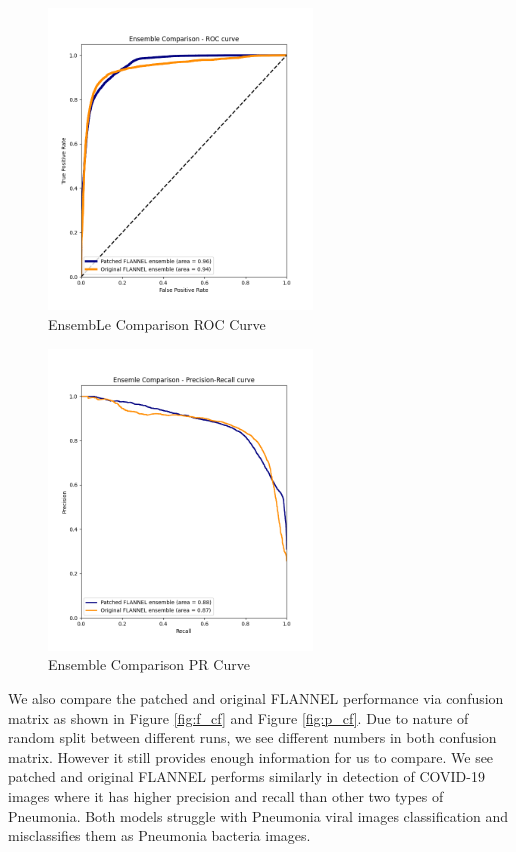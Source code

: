 \documentclass{sigkddExp}
\begin{document}
\begin{figure}[h]
    \centering
    \includegraphics[width=7cm]{../doc/images/ensemble_comparison_roc_curve.png}
    \caption{EnsembLe Comparison ROC Curve}
    \label{fig:ec_roccurve}
\end{figure}

\begin{figure}[h]
    \centering
    \includegraphics[width=7cm]{../doc/images/ensemble_comparison_precision_recall_curve.png}
    \caption{Ensemble Comparison PR Curve}
    \label{fig:ec_prcurve}
\end{figure}


We also compare the patched and original FLANNEL performance via confusion
matrix as shown in Figure \ref{fig:f_cf} and Figure \ref{fig:p_cf}. Due to
nature of random split between different runs, we see different numbers in both
confusion matrix. However it still provides enough information for us to compare.
We see patched and original FLANNEL performs similarly in detection of COVID-19 images
where it has higher precision and recall than other two types of Pneumonia. Both
models struggle with Pneumonia viral images classification and misclassifies
them as Pneumonia bacteria images.
\end{document}
